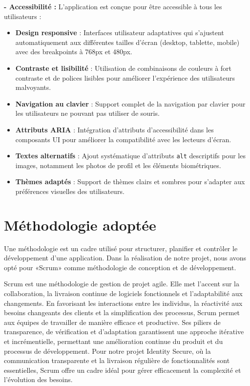 \textbf{- Accessibilité :} L'application est conçue pour être accessible à tous les utilisateurs :
\begin{itemize}[label=$\circ$]
  \item \textbf{Design responsive} : Interfaces utilisateur adaptatives qui s'ajustent automatiquement aux différentes tailles d'écran (desktop, tablette, mobile) avec des breakpoints à 768px et 480px.
  \item \textbf{Contraste et lisibilité} : Utilisation de combinaisons de couleurs à fort contraste et de polices lisibles pour améliorer l'expérience des utilisateurs malvoyants.
  \item \textbf{Navigation au clavier} : Support complet de la navigation par clavier pour les utilisateurs ne pouvant pas utiliser de souris.
  \item \textbf{Attributs ARIA} : Intégration d'attributs d'accessibilité dans les composants UI pour améliorer la compatibilité avec les lecteurs d'écran.
  \item \textbf{Textes alternatifs} : Ajout systématique d'attributs \texttt{alt} descriptifs pour les images, notamment les photos de profil et les éléments biométriques.
  \item \textbf{Thèmes adaptés} : Support de thèmes clairs et sombres pour s'adapter aux préférences visuelles des utilisateurs.
\end{itemize}
\section{Méthodologie adoptée}

Une méthodologie est un cadre utilisé pour structurer, planifier et contrôler le développement d'une application. Dans la réalisation de notre projet, nous avons opté pour «Scrum» comme méthodologie de conception et de développement.

Scrum est une méthodologie de gestion de projet agile\cite{b6}. Elle met l'accent sur la collaboration, la livraison continue de logiciels fonctionnels et l'adaptabilité aux changements. En favorisant les interactions entre les individus, la réactivité aux besoins changeants des clients et la simplification des processus, Scrum permet aux équipes de travailler de manière efficace et productive. Ses piliers de transparence, de vérification et d'adaptation garantissent une approche itérative et incrémentielle, permettant une amélioration continue du produit et du processus de développement. Pour notre projet Identity Secure, où la communication transparente et la livraison régulière de fonctionnalités sont essentielles, Scrum offre un cadre idéal pour gérer efficacement la complexité et l'évolution des besoins.
\\

